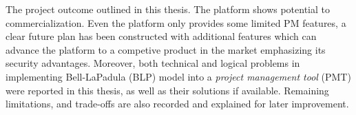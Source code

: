 The project outcome outlined in this thesis.
The platform shows potential to commercialization.
Even the platform only provides some limited PM features, a clear future plan has been constructed with additional features which can advance the platform to a competive product in the market emphasizing its security advantages.
Moreover, both technical and logical problems in implementing Bell-LaPadula (BLP) model into a \emph{project management tool} (PMT) were reported in this thesis, as well as their solutions if available.
Remaining limitations, and trade-offs are also recorded and explained for later improvement.

\endgroup			

\vfill
